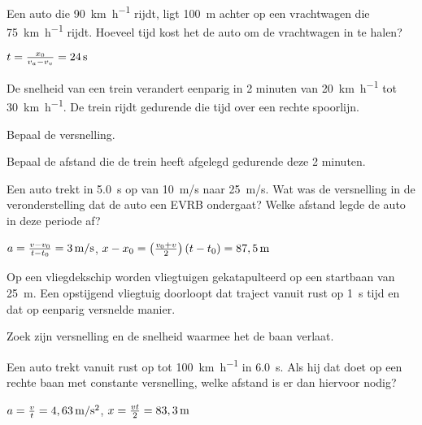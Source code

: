 \documentclass{ximera}
\begin{document}
\begin{exercise}
    Een auto die \SI{90}{\kilo\meter\per\hour} rijdt, ligt \SI{100}{m} achter op een vrachtwagen die \SI{75}{\kilo\meter\per\hour} rijdt. Hoeveel tijd kost het de auto om de vrachtwagen in te halen? 
    \begin{oplossing}
        $t=\frac{x_0}{v_a-v_v}=24\rm\,s$
    \end{oplossing}
\end{exercise}

\begin{exercise}
    De snelheid van een trein verandert eenparig in 2 minuten van \SI{20}{\kilo\meter\per\hour} tot \SI{30}{\kilo\meter\per\hour}. De trein rijdt gedurende die tijd over een rechte spoorlijn.
    \begin{question} Bepaal de versnelling.                                                  \end{question}
    \begin{question} Bepaal de afstand die de trein heeft afgelegd gedurende deze 2 minuten. \end{question}
\end{exercise}

\begin{exercise}
    Een auto trekt in \SI{5,0}{s} op van \SI{10}{m/s} naar \SI{25}{m/s}. Wat was de versnelling in de veronderstelling dat de auto een EVRB ondergaat? Welke afstand legde de auto in deze periode af?
    \begin{oplossing}
        $a=\frac{v-v_0}{t-t_0}=3\rm\,m/s$,
        $x-x_0=\left(\frac{v_0+v}{2}\right)(t-t_0)=87,5\rm\,m$
    \end{oplossing}
\end{exercise}

\begin{exercise}
    Op een vliegdekschip worden vliegtuigen gekatapulteerd op een startbaan van \SI{25}{\meter}. 
    Een opstijgend vliegtuig doorloopt dat traject vanuit rust op \SI{1}{\second} tijd en dat op eenparig versnelde manier.

    Zoek zijn versnelling en de snelheid waarmee het de baan verlaat.
\end{exercise}

\begin{exercise}
    Een auto trekt vanuit rust op tot \SI{100}{\kilo\meter\per\hour} in \SI{6,0}{s}. Als hij dat doet op een rechte baan met constante versnelling, welke afstand is er dan hiervoor nodig?
    \begin{oplossing}
        $a=\frac{v}{t}=4,63\rm\,m/s^2$, $x=\frac{vt}{2}=83,3\rm\,m$
    \end{oplossing}
\end{exercise}
\end{document}
